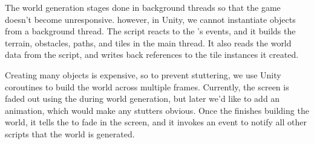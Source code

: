 The world generation stages done in background threads so that the game doesn't become unresponsive.
however, in Unity, we cannot instantiate objects from a background thread.
The script  reacts to the 's events, and it builds the terrain, obstacles, paths, and tiles in the main thread.
It also reads the world data from the  script, and writes back references to the tile instances it created.

Creating many objects is expensive, so to prevent stuttering, we use Unity coroutines to build the world across multiple frames.
Currently, the screen is faded out using the  during world generation, but later we'd like to add an animation, which would make any stutters obvious.
Once the  finishes building the world, it tells the  to fade in the screen, and it invokes an event to notify all other scripts that the world is generated.